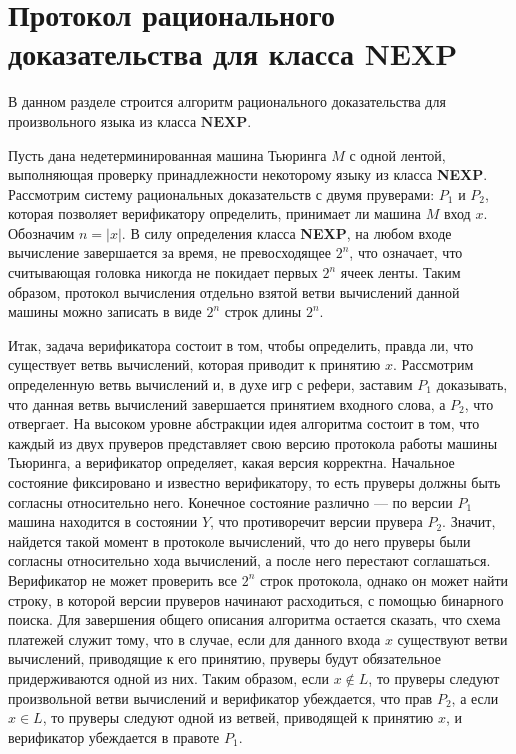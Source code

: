 \documentclass[14pt, a4paper]{extreport}
\begin{document}
        \section{Протокол рационального доказательства для класса $\textbf{NEXP}$}
        В данном разделе строится алгоритм рационального доказательства для произвольного языка из класса $\textbf{NEXP}$.

        Пусть дана недетерминированная машина Тьюринга $M$ с одной лентой, выполняющая проверку принадлежности некоторому языку из класса \textbf{NEXP}. Рассмотрим систему рациональных доказательств с двумя пруверами: $P_1$ и $P_2$, которая позволяет верификатору определить, принимает ли машина $M$ вход $x$. Обозначим $n = |x|$. В силу определения класса \textbf{NEXP}, на любом входе вычисление завершается за время, не превосходящее $2 ^ n$, что означает, что считывающая головка никогда не покидает первых $2^n$ ячеек ленты. Таким образом, протокол вычисления отдельно взятой ветви вычислений данной машины можно записать в виде $2^n$ строк длины $2^n$.

        Итак, задача верификатора состоит в том, чтобы определить, правда ли, что существует ветвь вычислений, которая приводит к принятию $x$. Рассмотрим определенную ветвь вычислений и, в духе игр с рефери, заставим $P_1$ доказывать, что данная ветвь вычислений завершается принятием входного слова, а $P_2$, что отвергает. На высоком уровне абстракции идея алгоритма состоит в том, что каждый из двух пруверов представляет свою версию протокола работы машины Тьюринга, а верификатор определяет, какая версия корректна. Начальное состояние фиксировано и известно верификатору, то есть пруверы должны быть согласны относительно него. Конечное состояние различно --- по версии $P_1$ машина находится в состоянии $Y$, что противоречит версии прувера $P_2$. Значит, найдется такой момент в протоколе вычислений, что до него пруверы были согласны относительно хода вычислений, а после него перестают соглашаться.
        Верификатор не может проверить все $2^n$ строк протокола, однако он может найти строку, в которой версии пруверов начинают расходиться, с помощью бинарного поиска. Для завершения общего описания алгоритма остается сказать, что схема платежей служит тому, что в случае, если для данного входа $x$ существуют ветви вычислений, приводящие к его принятию, пруверы будут обязательное придерживаются одной из них. Таким образом, если $x \notin L$, то пруверы следуют произвольной ветви вычислений и верификатор убеждается, что прав $P_2$, а если $x \in L$, то пруверы следуют одной из ветвей, приводящей к принятию $x$, и верификатор убеждается в правоте $P_1$.
\end{document}
